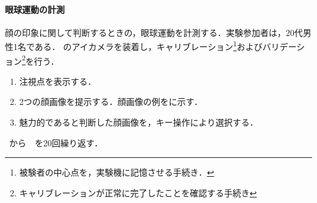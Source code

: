 \paragraph{眼球運動の計測}
顔の印象に関して判断するときの，眼球運動を計測する．実験参加者は，20代男性1名である．
\elt のアイカメラを装着し，キャリブレーション\footnote{被験者の中心点を，実験機に記憶させる手続き．}およびバリデーション\footnote{キャリブレーションが正常に完了したことを確認する手続き}を行う．
\begin{enumerate}
    \renewcommand{\labelenumi}{\fbox{\theenumi}}
    \item 注視点を表示する．
    \item 2つの顔画像を提示する．顔画像の例をに示す．
    \item 魅力的であると判断した顔画像を，キー操作により選択する．
\end{enumerate}
\ から\ \ を20回繰り返す．
